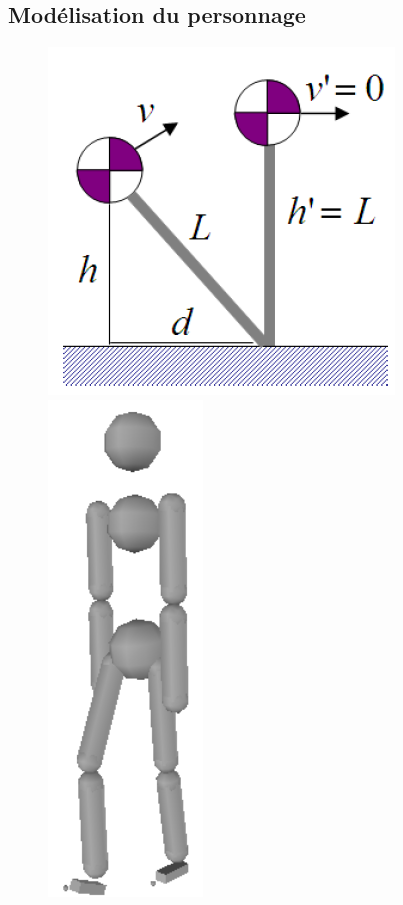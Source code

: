 \documentclass[runningheads,a4paper]{llncs}
\begin{document}
\subsection{Modélisation du personnage}
%
\begin{figure}[h]
\centering
\includegraphics[scale=0.5]{IPM.png}
\includegraphics[scale=0.5]{colli_primitives.png}

\end{figure}
\end{document}
